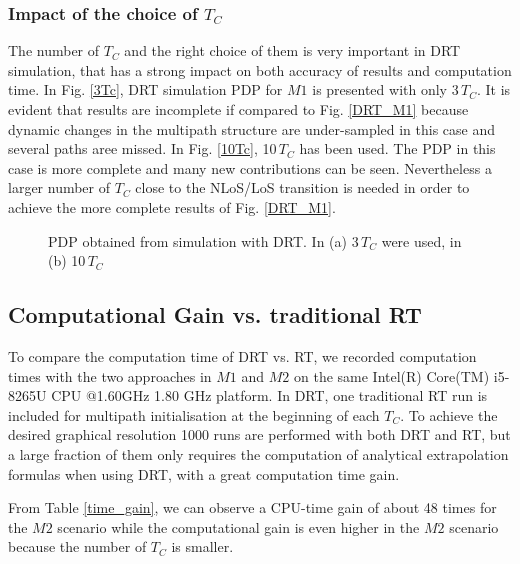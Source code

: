 \subsubsection{Impact of the choice of $T_C$}
The number of $T_C$ and the right choice of them is very important in  DRT simulation, that has a strong impact on both accuracy of results and computation time. In Fig. \ref{3Tc}, DRT simulation PDP for $M1$ is presented with only 3\,$T_C$. It is evident that results are incomplete if compared to Fig. \ref{DRT_M1} because dynamic changes in the multipath structure are under-sampled in this case and several paths aree missed. In Fig. \ref{10Tc}, 10\,$T_C$ has been used. The PDP in this case is more complete and many new contributions can be seen. Nevertheless a larger number of $T_C$ close to the NLoS/LoS transition is needed in order to achieve the more complete results of Fig. \ref{DRT_M1}.  

\begin{figure*}[t]
    
    \captionsetup[subfigure]{font=scriptsize,labelfont=scriptsize}
    \centering
    \quad \quad \quad \quad
    \caption{PDP obtained from simulation with DRT. In (a) 3\,$T_C$ were used, in (b) 10\,$T_C$}
\end{figure*}


\subsection{Computational Gain vs. traditional RT}
To compare the computation time of DRT vs. RT, we recorded computation times with the two approaches in $M1$ and $M2$ on the same Intel(R) Core(TM) i5-8265U CPU @1.60GHz 1.80 GHz platform. In DRT, one traditional RT run is included for multipath initialisation at the beginning of each $T_C$. To achieve the desired graphical resolution 1000 runs are performed with both DRT and RT, but a large fraction of them only requires the computation of analytical extrapolation formulas when using DRT, with a great computation time gain. \par
From Table \ref{time_gain}, we can observe a CPU-time  gain of about 48 times for the  $M2$ scenario while the computational gain is even higher in the $M2$ scenario because the number of $T_C$ is smaller.

